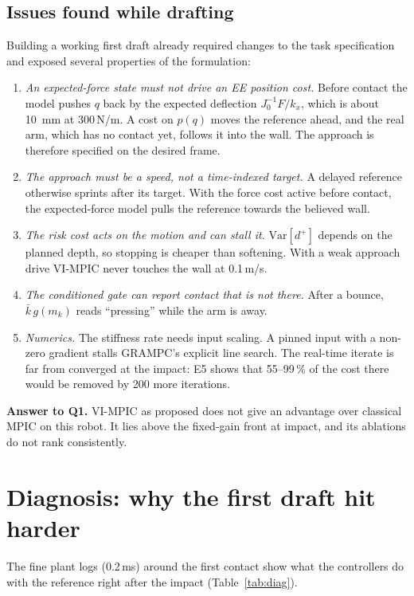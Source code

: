 \documentclass[11pt,a4paper]{article}
\newcommand{\kb}{\bar{k}}
\newcommand{\kx}{k_{x}}
\begin{document}
\subsection{Issues found while drafting}\label{sec:issues}
Building a working first draft already required changes to the task specification and exposed several
properties of the formulation:
\begin{enumerate}[label=I\arabic*.]
\item \emph{An expected-force state must not drive an EE position cost.} Before contact the model pushes
  $q$ back by the expected deflection $J_0^{-1}F/\kx$, which is about \SI{10}{mm} at 300\,N/m. A cost on
  $p(q)$ moves the reference ahead, and the real arm, which has no contact yet, follows it into the wall.
  The approach is therefore specified on the desired frame.
\item \emph{The approach must be a speed, not a time-indexed target.} A delayed reference otherwise
  sprints after its target. With the force cost active before contact, the expected-force model pulls the
  reference towards the believed wall.
\item \emph{The risk cost acts on the motion and can stall it.} $\mathrm{Var}[d^+]$ depends on the planned
  depth, so stopping is cheaper than softening. With a weak approach drive VI-MPIC never touches the wall
  at 0.1\,m/s.
\item \emph{The conditioned gate can report contact that is not there.} After a bounce, $\kb\,g(m_k)$
  reads ``pressing'' while the arm is away.
\item \emph{Numerics.} The stiffness rate needs input scaling. A pinned input with a non-zero gradient
  stalls GRAMPC's explicit line search. The real-time iterate is far from converged at the impact: E5
  shows that 55--99\,\% of the cost there would be removed by 200 more iterations.
\end{enumerate}

\textbf{Answer to Q1.} VI-MPIC as proposed does not give an advantage over classical MPIC on this robot. It
lies above the fixed-gain front at impact, and its ablations do not rank consistently.

\section{Diagnosis: why the first draft hit harder}\label{sec:diag}

The fine plant logs (0.2\,ms) around the first contact show what the controllers do with the reference
right after the impact (Table~\ref{tab:diag}).
\end{document}
